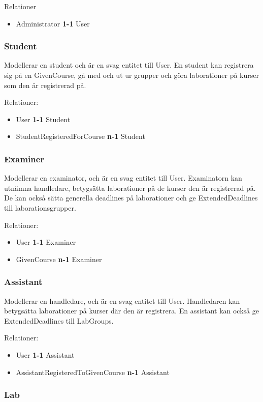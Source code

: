 Relationer
\begin{itemize}
  \item Administrator {\bf 1-1} User
\end{itemize}


\subsubsection{Student}
Modellerar en student och är en svag entitet till User. En student kan registrera sig på en GivenCourse, gå med och ut ur grupper och göra laborationer på kurser som den är registrerad på. 

Relationer: 
\begin{itemize}
  \item User {\bf 1-1} Student 
  \item StudentRegisteredForCourse {\bf n-1} Student 
\end{itemize}

\subsubsection{Examiner}
Modellerar en examinator, och är en svag entitet till User. Examinatorn kan utnämna handledare, betygsätta laborationer på de kurser den är registrerad på. De kan också sätta generella deadlines på laborationer och ge ExtendedDeadlines till laborationsgrupper.  

Relationer: 
\begin{itemize}
  \item User {\bf 1-1} Examiner 
  \item GivenCourse {\bf n-1} Examiner 
\end{itemize}

\subsubsection{Assistant}
Modellerar en handledare, och är en svag entitet till User. Handledaren kan betygsätta laborationer på kurser där den är registrera. En assistant kan också ge ExtendedDeadlines till LabGroups. 

Relationer: 
\begin{itemize}
  \item User {\bf 1-1} Assistant 
  \item AssistantRegisteredToGivenCourse {\bf n-1} Assistant 
\end{itemize}

\subsubsection{Lab}

